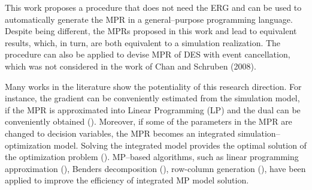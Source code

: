 \documentclass[suppldata]{interact}
\theoremstyle{plain}
\theoremstyle{definition}
\theoremstyle{remark}
\begin{document}
This work proposes a procedure that does not need %
the ERG and %
can be used to automatically generate the MPR in a general--purpose programming language. Despite %
being different, the MPRs proposed in this work and \cite{chan2008optimization} lead to %
equivalent results, which, in turn, are both equivalent to a simulation realization. The procedure can also be applied to devise MPR of DES with event cancellation, which was not considered in the work of Chan and Schruben (2008).


Many works in the literature show the potentiality of this research direction. For instance, the gradient can be conveniently estimated from the simulation model, if the MPR is approximated into Linear Programming (LP) and %
the dual can be conveniently obtained (\cite{chan2008optimization}). Moreover, if some of the parameters in the MPR are changed to decision variables, the MPR becomes an integrated simulation--optimization model. Solving the integrated model provides the optimal solution of the optimization problem (\cite{matta2008simulation}). MP--based algorithms, such as linear programming approximation (\cite{alfieri2012mathematical}), Benders decomposition (\cite{weiss2015buffer}), row-column generation (\cite{alfieri2020time}), have been applied to improve the efficiency of %
integrated MP model solution. 
\end{document}
